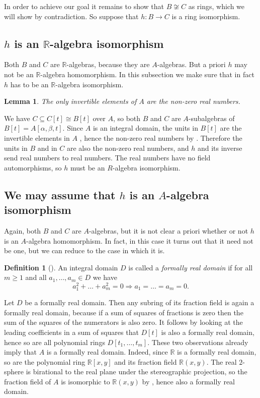 \documentclass[A4paper, 12pt, british, reqno]{amsart}
\newcommand{\R}{\mathbb{R}} %
\theoremstyle{plain}
\newtheorem{lm}[thm]{Lemma}
\theoremstyle{definition}
\newtheorem{defn}[thm]{Definition}
\theoremstyle{remark}
\theoremstyle{plain}
\theoremstyle{definition}
\theoremstyle{remark}
\theoremstyle{plain}
\theoremstyle{definition}
\theoremstyle{remark}
\begin{document}
In order to achieve our goal it remains to show that $B\not\cong C$ as rings, which we will show by contradiction.
So suppose that $h\colon B\to C$ is a ring isomorphism.

\subsection{$h$ is an $\R$-algebra isomorphism}
Both $B$ and $C$ are $\R$-algebras, because they are $A$-algebras.
But a priori $h$ may not be an $\R$-algebra homomorphism.
In this subsection we make sure that in fact $h$ has to be an $\R$-algebra isomorphism.

\begin{lm}\label{lm:units}
    The only invertible elements of $A$ are the non-zero real numbers.
\end{lm}

We have $C\subseteq C[t]\cong B[t]$ over $A$, so both $B$ and $C$ are $A$-subalgebras of $B[t]=A[\alpha,\beta,t]$.
Since $A$ is an integral domain, the units in $B[t]$ are the invertible elements in $A$ \cite[Exercise 2 of \S 1]{am69}, hence the non-zero real numbers by .
Therefore the units in $B$ and in $C$ are also the non-zero real numbers, and $h$ and its inverse send real numbers to real numbers.
The real numbers have no field automorphisms, so $h$ must be an $R$-algebra isomorphism.

\subsection{We may assume that $h$ is an $A$-algebra isomorphism}
Again, both $B$ and $C$ are $A$-algebras, but it is not clear a priori whether or not $h$ is an $A$-algebra homomorphism.
In fact, in this case it turns out that it need not be one, but we can reduce to the case in which it is.

\begin{defn}[{\cite[\S 10.1.5]{fre17}}]
    An integral domain $D$ is called a \textit{formally real domain} if for all $m\geqslant 1$ and all $a_{1},\ldots,a_{m}\in D$ we have
    \[ a_{1}^{2}+\ldots+a_{m}^{2}=0 \Rightarrow a_{1}=\ldots=a_{m}=0. \]
\end{defn}

Let $D$ be a formally real domain.
Then  any subring of its fraction field is again a formally real domain, because if a sum of squares of fractions is zero then the sum of the squares of the numerators is also zero.
It follows by looking at the leading coefficients in a sum of squares that $D[t]$ is also a formally real domain, hence so are all polynomial rings $D[t_{1},\ldots,t_{m}]$.
These two observations already imply that $A$ is a formally real domain.
Indeed, since $\R$ is a formally real domain, so are the polynomial ring $\R[x,y]$ and its fraction field $\R(x,y)$.
The real $2$-sphere is birational to the real plane under the stereographic projection, so the fraction field of $A$ is isomorphic to $\R(x,y)$ by \cite[Lemma 9.33]{gw10}, hence also a formally real domain.
\end{document}
